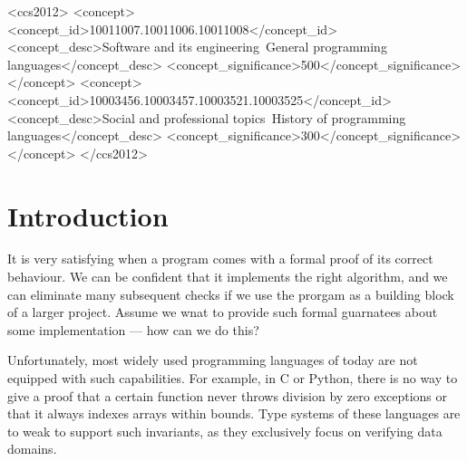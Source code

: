 \documentclass[acmsmall,review,anonymous]{acmart}\settopmatter{printfolios=true,printccs=false,printacmref=false}
\begin{document}
\begin{CCSXML}
<ccs2012>
<concept>
<concept_id>10011007.10011006.10011008</concept_id>
<concept_desc>Software and its engineering~General programming languages</concept_desc>
<concept_significance>500</concept_significance>
</concept>
<concept>
<concept_id>10003456.10003457.10003521.10003525</concept_id>
<concept_desc>Social and professional topics~History of programming languages</concept_desc>
<concept_significance>300</concept_significance>
</concept>
</ccs2012>
\end{CCSXML}





\maketitle

\section{Introduction}

It is very satisfying when a program comes with a formal proof of its
correct behaviour.  We can be confident that it implements the right algorithm,
and we can eliminate many subsequent checks if we use the prorgam as a building
block of a larger project.  Assume we wnat to provide such formal guarnatees
about some implementation --- how can we do this?

Unfortunately, most widely used programming languages of today are not equipped
with such capabilities.  For example, in C or Python, there is no way to give
a proof that a certain function never throws division by zero exceptions or
that it always indexes arrays within bounds.  Type systems of these languages
are to weak to support such invariants, as they exclusively focus on verifying
data domains.
\end{document}
